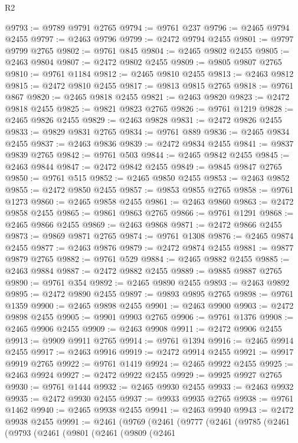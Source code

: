 \begin{lexlean}{R2}
\begin{coremodule}
@9793 := @9789 @9791 @2765
@9794 := @9761 @237
@9796 := @2465 @9794 @2455
@9797 := @2463 @9796
@9799 := @2472 @9794 @2455
@9801 := @9797 @9799 @2765
@9802 := @9761 @845
@9804 := @2465 @9802 @2455
@9805 := @2463 @9804
@9807 := @2472 @9802 @2455
@9809 := @9805 @9807 @2765
@9810 := @9761 @1184
@9812 := @2465 @9810 @2455
@9813 := @2463 @9812
@9815 := @2472 @9810 @2455
@9817 := @9813 @9815 @2765
@9818 := @9761 @867
@9820 := @2465 @9818 @2455
@9821 := @2463 @9820
@9823 := @2472 @9818 @2455
@9825 := @9821 @9823 @2765
@9826 := @9761 @1219
@9828 := @2465 @9826 @2455
@9829 := @2463 @9828
@9831 := @2472 @9826 @2455
@9833 := @9829 @9831 @2765
@9834 := @9761 @889
@9836 := @2465 @9834 @2455
@9837 := @2463 @9836
@9839 := @2472 @9834 @2455
@9841 := @9837 @9839 @2765
@9842 := @9761 @503
@9844 := @2465 @9842 @2455
@9845 := @2463 @9844
@9847 := @2472 @9842 @2455
@9849 := @9845 @9847 @2765
@9850 := @9761 @515
@9852 := @2465 @9850 @2455
@9853 := @2463 @9852
@9855 := @2472 @9850 @2455
@9857 := @9853 @9855 @2765
@9858 := @9761 @1273
@9860 := @2465 @9858 @2455
@9861 := @2463 @9860
@9863 := @2472 @9858 @2455
@9865 := @9861 @9863 @2765
@9866 := @9761 @1291
@9868 := @2465 @9866 @2455
@9869 := @2463 @9868
@9871 := @2472 @9866 @2455
@9873 := @9869 @9871 @2765
@9874 := @9761 @1308
@9876 := @2465 @9874 @2455
@9877 := @2463 @9876
@9879 := @2472 @9874 @2455
@9881 := @9877 @9879 @2765
@9882 := @9761 @529
@9884 := @2465 @9882 @2455
@9885 := @2463 @9884
@9887 := @2472 @9882 @2455
@9889 := @9885 @9887 @2765
@9890 := @9761 @354
@9892 := @2465 @9890 @2455
@9893 := @2463 @9892
@9895 := @2472 @9890 @2455
@9897 := @9893 @9895 @2765
@9898 := @9761 @1359
@9900 := @2465 @9898 @2455
@9901 := @2463 @9900
@9903 := @2472 @9898 @2455
@9905 := @9901 @9903 @2765
@9906 := @9761 @1376
@9908 := @2465 @9906 @2455
@9909 := @2463 @9908
@9911 := @2472 @9906 @2455
@9913 := @9909 @9911 @2765
@9914 := @9761 @1394
@9916 := @2465 @9914 @2455
@9917 := @2463 @9916
@9919 := @2472 @9914 @2455
@9921 := @9917 @9919 @2765
@9922 := @9761 @1419
@9924 := @2465 @9922 @2455
@9925 := @2463 @9924
@9927 := @2472 @9922 @2455
@9929 := @9925 @9927 @2765
@9930 := @9761 @1444
@9932 := @2465 @9930 @2455
@9933 := @2463 @9932
@9935 := @2472 @9930 @2455
@9937 := @9933 @9935 @2765
@9938 := @9761 @1462
@9940 := @2465 @9938 @2455
@9941 := @2463 @9940
@9943 := @2472 @9938 @2455
@9991 := @2461
    (@9769
      (@2461
        (@9777
          (@2461
            (@9785
              (@2461
                (@9793
                  (@2461
                    (@9801
                      (@2461
                        (@9809
                          (@2461

\end{coremodule}
\end{lexlean}
